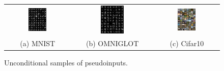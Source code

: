 \begin{figure}[!htbp]
    \centering
    \begin{tabular}{ccc}
    \includegraphics[width=0.3\textwidth]{pics/5_dvp/mnist_ctx_samples.pdf} &  
        \includegraphics[width=0.3\textwidth]{pics/5_dvp/omniglot_ctx_samples.pdf} & 
        \includegraphics[width=0.3\textwidth]{pics/5_dvp/cifar10_ctx_samples.pdf}\\
        (a) MNIST  & (b) OMNIGLOT & (c) Cifar10\\
    \end{tabular}
    \caption{Unconditional samples of pseudoinputs.}
    \label{fig:ctx_samples}
\end{figure}


